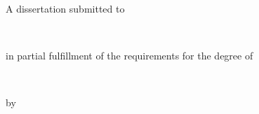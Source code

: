 \begin{titlepage}
\begin{center}

{\huge \bfseries \ttitle\par}%

\baselineskip
\vfill
\large A dissertation submitted to \\[0.2cm]
\par
\deptname
\par
\OU \\[0.2cm]
\par
\large in partial fulfillment of the requirements for the degree of \\[0.2cm]
\par
\textbf{\degreename} \\[0.2cm]
\par
{}\baselineskip
\vfill
by
\par
\authorname
\par
\par
\vfill
{\large \degreemm\ \degreeyy}%
\vfill
\par
{}\baselineskip
\copyrightnotice
\par
\vfill

\end{center}
\end{titlepage}